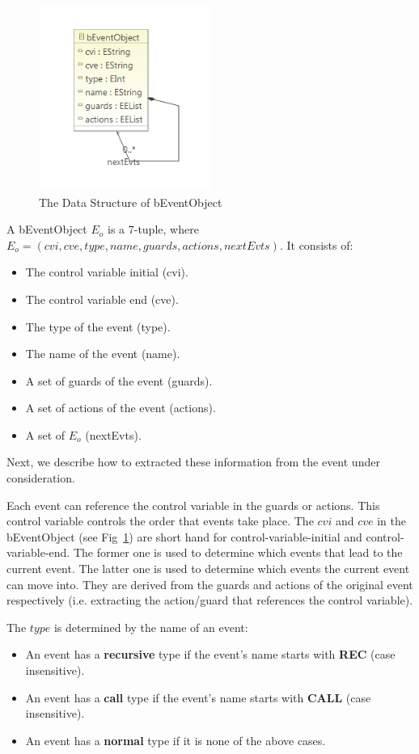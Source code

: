 \documentclass{easychair}
\begin{document}
\begin{figure}[!h]
  \centering
    \includegraphics[width=0.5\textwidth]{img/ebo.PNG}
  \caption{The Data Structure of bEventObject}
  \label{fig:ebo}
\end{figure}

A bEventObject $E_o$ is a 7-tuple, where $E_o = (cvi, cve, type, name, guards, actions, nextEvts)$. It consists of:
\begin{itemize}
	\item The control variable initial (cvi).
	\item The control variable end (cve).
	\item The type of the event (type).
	\item The name of the event (name).
	\item A set of guards of the event (guards).
	\item A set of actions of the event (actions).
	\item A set of $E_o$ (nextEvts). 
\end{itemize}
Next, we describe how to extracted these information from the event under consideration.

Each event can reference the control variable in the guards or actions. This control variable controls the order that events take place. The $cvi$ and $cve$ in the bEventObject (see Fig~\ref{fig:ebo}) are short hand for control-variable-initial and control-variable-end. The former one is used to determine which events that lead to the current event. The latter one is used to determine which events the current event can move into. They are derived from the guards and actions of the original event respectively (i.e. extracting the action/guard that references the control variable).

The $type$ is determined by the name of an event:
\begin{itemize}
	\item An event has a \textbf{recursive} type if the event's name starts with \textbf{REC} (case insensitive).
	\item An event has a \textbf{call} type if the event's name starts with \textbf{CALL} (case insensitive).
	\item An event has a \textbf{normal} type if it is none of the above cases.
\end{itemize}
\end{document}
